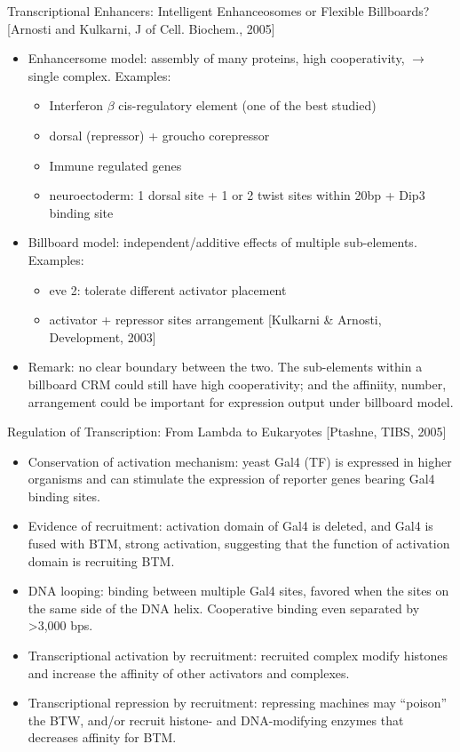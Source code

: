 \documentclass{report}
\begin{document}
Transcriptional Enhancers: Intelligent Enhanceosomes or Flexible Billboards? [Arnosti and Kulkarni, J of Cell. Biochem., 2005]
\begin{itemize}
	\item Enhancersome model: assembly of many proteins, high cooperativity, $\rightarrow$ single complex. Examples: 
	\begin{itemize}
		\item Interferon $\beta$ cis-regulatory element (one of the best studied)
		\item dorsal (repressor) + groucho corepressor
		\item Immune regulated genes
		\item neuroectoderm: 1 dorsal site + 1 or 2 twist sites within 20bp + Dip3 binding site
	\end{itemize}
	
	\item Billboard model: independent/additive effects of multiple sub-elements. Examples: 
	\begin{itemize}
		\item eve 2: tolerate different activator placement
		\item activator + repressor sites arrangement [Kulkarni \& Arnosti, Development, 2003]
	\end{itemize}
	
	\item Remark: no clear boundary between the two. The sub-elements within a billboard CRM could still have high cooperativity; and the affiniity, number, arrangement could be important for expression output under billboard model. 
\end{itemize}

Regulation of Transcription: From Lambda to Eukaryotes [Ptashne, TIBS, 2005]
\begin{itemize}
	\item Conservation of activation mechanism: yeast Gal4 (TF) is expressed in higher organisms and can stimulate the expression of reporter genes bearing Gal4 binding sites. 
	\item Evidence of recruitment: activation domain of Gal4 is deleted, and Gal4 is fused with BTM, strong activation, suggesting that the function of activation domain is recruiting BTM. 
	\item DNA looping: binding between multiple Gal4 sites, favored when the sites on the same side of the DNA helix. Cooperative binding even separated by >3,000 bps. 
	\item Transcriptional activation by recruitment: recruited complex modify histones and increase the affinity of other activators and complexes. 
	\item Transcriptional repression by recruitment: repressing machines may ``poison'' the BTW, and/or recruit histone- and DNA-modifying enzymes that decreases affinity for BTM. 
\end{itemize}
\end{document}
